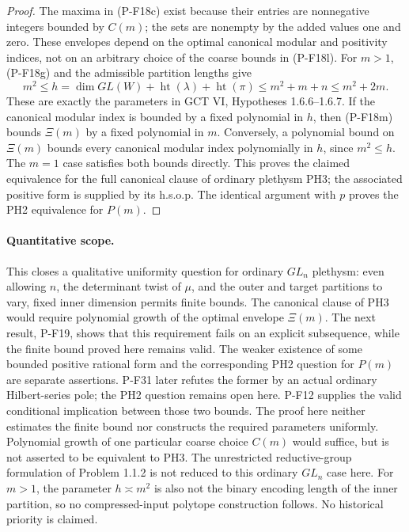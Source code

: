\documentclass[11pt,a4paper]{article}
\begin{document}
\begin{proof}
The maxima in (P-F18c) exist because their entries are nonnegative
integers bounded by $C(m)$; the sets are nonempty by the added
values one and zero. These envelopes depend on the optimal
canonical modular and positivity indices, not on an arbitrary
choice of the coarse bounds in (P-F18l).
For $m>1$, (P-F18g) and the admissible partition lengths give
\[
 m^2\le
 h=\dim GL(W)+\operatorname{ht}(\lambda)+\operatorname{ht}(\pi)
 \le m^2+m+n\le m^2+2m.
 \tag{P-F18m}
\]
These are exactly the parameters in GCT VI, Hypotheses 1.6.6--1.6.7.
If the canonical modular index is bounded by a fixed polynomial in
$h$, then (P-F18m) bounds $\Xi(m)$ by a fixed polynomial in $m$.
Conversely, a polynomial bound on $\Xi(m)$ bounds every canonical
modular index polynomially in $h$, since $m^2\le h$.
The $m=1$ case satisfies both bounds directly. This proves the
claimed equivalence for the full canonical clause of ordinary
plethysm PH3; the associated positive form is supplied by its
h.s.o.p. The identical argument with $p$ proves the PH2 equivalence
for $P(m)$.
\end{proof}

\paragraph{Quantitative scope.}
This closes a qualitative uniformity question for ordinary
$GL_n$ plethysm: even allowing $n$, the determinant twist of $\mu$,
and the outer and target partitions to vary, fixed inner dimension
permits finite bounds. The canonical clause of PH3 would require
polynomial growth of the optimal envelope $\Xi(m)$. The next
result, P-F19, shows that this requirement fails on an explicit
subsequence, while the finite bound proved here remains valid.
The weaker existence of some bounded positive rational form and the
corresponding PH2 question for $P(m)$ are separate assertions.
P-F31 later refutes the former by an actual ordinary Hilbert-series
pole; the PH2 question remains open here. P-F12 supplies the valid
conditional implication between those two bounds.
The proof here neither estimates the finite bound nor constructs
the required parameters uniformly. Polynomial growth of one particular coarse choice
$C(m)$ would suffice, but is not asserted to be equivalent to PH3.
The unrestricted reductive-group formulation of Problem 1.1.2 is
not reduced to this ordinary $GL_n$ case here. For $m>1$, the parameter
$h\asymp m^2$ is also not the binary encoding length of the inner
partition, so no compressed-input polytope construction follows.
No historical priority is claimed.
\end{document}

